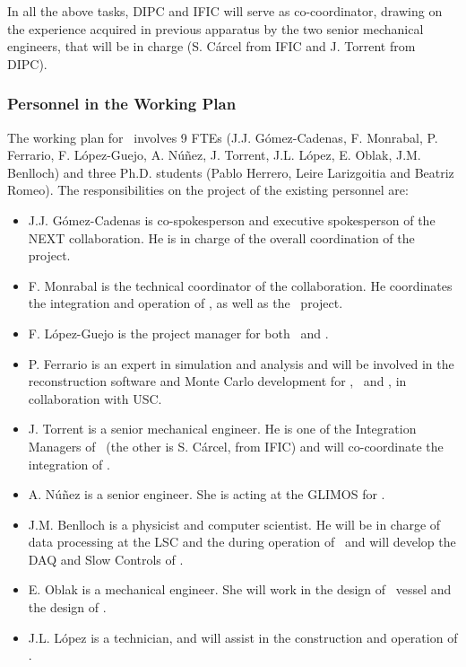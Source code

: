\indent

In all the above tasks, DIPC and IFIC will serve as co-coordinator, drawing on the experience acquired in previous apparatus by the two senior mechanical engineers, that will be in charge (S. C\'arcel from IFIC and J. Torrent from DIPC). 

\subsubsection*{Personnel in the Working Plan}
The working plan for \sDIPC\ involves 9 FTEs (J.J. G\'omez-Cadenas, F. Monrabal, P. Ferrario, F. L\'opez-Guejo, A. N\'u\~nez, J. Torrent, J.L. L\'opez, E. Oblak, J.M. Benlloch) and three Ph.D. students (Pablo Herrero, Leire Larizgoitia and Beatriz Romeo). The responsibilities on the project of the existing personnel are:


\begin{itemize}[noitemsep,topsep=0pt,parsep=0pt,partopsep=0pt]
\item J.J. G\'omez-Cadenas is co-spokesperson and executive spokesperson of the NEXT collaboration. He is in charge of the overall coordination of the project. 
\item F. Monrabal is the technical coordinator of the collaboration. He coordinates the integration and operation of \Next, as well as the \HDEMO\ project.
\item  F. L\'opez-Guejo is the project manager  for both \Next\ and \NHD.
\item P. Ferrario is an expert in simulation and analysis and will be involved in the reconstruction software and Monte Carlo development for \Next, \HDEMO\ and \NHD, in collaboration with USC. 
\item J. Torrent is a senior mechanical engineer. He is one of the Integration Managers of \Next\ (the other is S. C\'arcel, from IFIC) and will co-coordinate the integration of \NHD. 
\item A. N\'u\~nez is a senior engineer. She is acting at the GLIMOS  for \Next. 
\item J.M. Benlloch is a  physicist and computer scientist. He will be in charge of data processing at the LSC and the during operation of \Next\ and will develop the DAQ and Slow Controls of \HDEMO.
\item E. Oblak is a  mechanical engineer. She  will work in the design of \NHD\ vessel and the design of \HDEMO.  
\item J.L. L\'opez is a technician, and will assist in the construction and operation of \HDEMO. 
\end{itemize}

